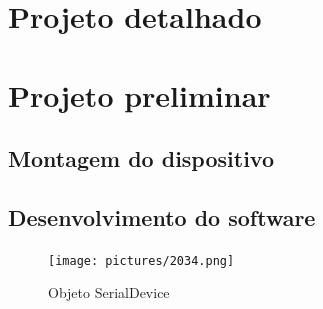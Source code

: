 \section{Projeto detalhado}

\section{Projeto preliminar}

\subsection[]{Montagem do dispositivo}

\begin{table}[!ht]
    \caption{Características de ganho para o ADS1115}
    \label{tab:ads1115modes}
    \centering
\end{table}

\subsection[]{Desenvolvimento do software}

\begin{figure}[htb]
	\caption{\label{fig:2034} Objeto SerialDevice}
	\begin{center}
		\texttt{[image: pictures/2034.png]}
	\end{center}
\end{figure}



